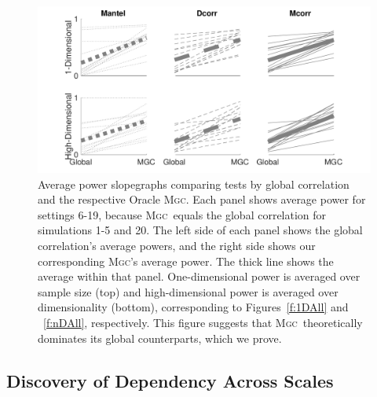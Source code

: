 \documentclass[11pt]{article}
\providecommand{\sct}[1]{{\normalfont\textsc{#1}}}
\newcommand{\Mgc}{\sct{Mgc}}
\newcommand{\Mgcp}{\sct{Mgc$_P$}}
\newcommand{\Hhg}{\sct{Hhg}}
\newcommand{\Dcorr}{\sct{Dcorr}}
\newcommand{\Mcorr}{\sct{Mcorr}}
\newcommand{\Mantel}{\sct{Mantel}}
\begin{document}
\begin{figure}
  \centering
  \includegraphics[width=1.0\textwidth]{Figures/FigSlope}
  \caption{
Average power slopegraphs comparing tests by global correlation and the respective Oracle \Mgc.  Each panel shows average power for settings 6-19, because \Mgc~equals the global correlation for simulations 1-5 and  20. 
%
%
%
The left side of each panel shows the global correlation's average powers, and 
the right side shows our corresponding \Mgc's average power. The thick line shows the average within that panel. 
One-dimensional power is averaged over sample size (top)  and high-dimensional power is averaged over dimensionality (bottom), corresponding to Figures~\ref{f:1DAll} and ~\ref{f:nDAll}, respectively.
This figure suggests that \Mgc~theoretically dominates its global counterparts, which we prove. 
}
\label{f:pp}
\end{figure}





\subsection*{Discovery of Dependency Across Scales}
\label{main3}
\end{document}
